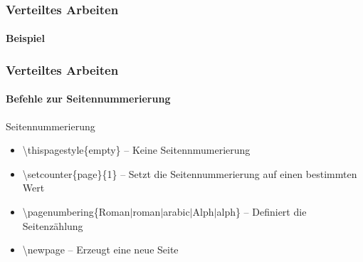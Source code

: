 

\begin{frame}
\frametitle{Verteiltes Arbeiten}
\framesubtitle{Beispiel}




\end{frame}




\begin{frame}
\frametitle{Verteiltes Arbeiten}
\framesubtitle{Befehle zur Seitennummerierung}
\begin{block}{Seitennummerierung}
\begin{itemize}
\item \color{nounibaredI}\textbackslash thispagestyle\color{black}\{empty\} -- Keine Seitennmumerierung
\item \color{nounibaredI}\textbackslash setcounter\color{black}\{page\}\{1\} -- Setzt die Seitennummerierung auf einen bestimmten Wert
\item \color{nounibaredI}\textbackslash pagenumbering\color{black}\{Roman$\mid$roman$\mid$arabic$\mid$Alph$\mid$alph\} -- Definiert die Seitenz\"ahlung
\item \color{nounibaredI}\textbackslash  newpage \color{black}-- Erzeugt eine neue Seite
\end{itemize}
\end{block}
\end{frame}
